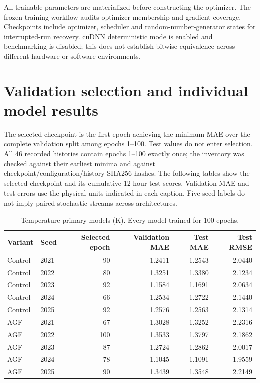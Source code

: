 \documentclass[10pt,a4paper]{article}
\begin{document}
All trainable parameters are materialized before constructing the optimizer. The frozen training workflow audits optimizer membership and gradient coverage. Checkpoints include optimizer, scheduler and random-number-generator states for interrupted-run recovery. cuDNN deterministic mode is enabled and benchmarking is disabled; this does not establish bitwise equivalence across different hardware or software environments.

\section{Validation selection and individual model results}
The selected checkpoint is the first epoch achieving the minimum MAE over the complete validation split among epochs 1--100. Test values do not enter selection. All 46 recorded histories contain epochs 1--100 exactly once; the inventory was checked against their earliest minima and against checkpoint/configuration/history SHA256 hashes. The following tables show the selected checkpoint and its cumulative 12-hour test scores. Validation MAE and test errors use the physical units indicated in each caption. Five seed labels do not imply paired stochastic streams across architectures.

\begin{table}[H]\centering\small\setlength{\tabcolsep}{5pt}\setlength{\parskip}{0pt}

\caption{Temperature primary models (K). Every model trained for 100 epochs.}\label{tab:seeds_temperature}

\begin{tabular}{llrrrr}

\toprule
Variant & Seed & Selected epoch & Validation MAE & Test MAE & Test RMSE \\
\midrule

Control & 2021 & 90 & 1.2411 & 1.2543 & 2.0440 \\

Control & 2022 & 80 & 1.3251 & 1.3380 & 2.1234 \\

Control & 2023 & 92 & 1.1584 & 1.1691 & 2.0634 \\

Control & 2024 & 66 & 1.2534 & 1.2722 & 2.1440 \\

Control & 2025 & 92 & 1.2576 & 1.2563 & 2.1314 \\

AGF & 2021 & 67 & 1.3028 & 1.3252 & 2.2316 \\

AGF & 2022 & 100 & 1.3533 & 1.3797 & 2.1862 \\

AGF & 2023 & 87 & 1.2724 & 1.2862 & 2.0017 \\

AGF & 2024 & 78 & 1.1045 & 1.1091 & 1.9559 \\

AGF & 2025 & 90 & 1.3439 & 1.3548 & 2.2149 \\

\bottomrule\end{tabular}\end{table}
\end{document}
